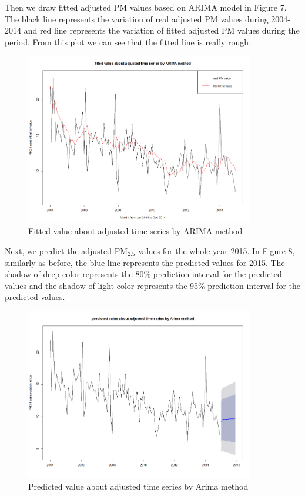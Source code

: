 \documentclass[10pt]{article}
\begin{document}
Then we draw fitted adjusted PM values based on ARIMA model in Figure 7. The black line represents the variation of real adjusted PM values during 2004-2014  and red line represents the variation of fitted adjusted PM values during the period. From this plot we can see that the fitted line is really rough.

\begin{figure}[H]
\centering
\includegraphics[width = 100mm]{ts5.png}
\caption{Fitted value about adjusted time series by ARIMA method}
\end{figure}

Next, we predict the adjusted PM$_{2.5}$ values for the whole year 2015. In Figure 8, similarly as before, the blue line represents the predicted values for 2015. The shadow of deep color represents the 80\% prediction interval for the predicted values and the shadow of light color represents the 95\% prediction interval for the predicted values.

\begin{figure}[H]
\centering
\includegraphics[width = 100mm]{ts6.png}
\caption{Predicted value about adjusted time series by Arima method}
\end{figure}
\end{document}
